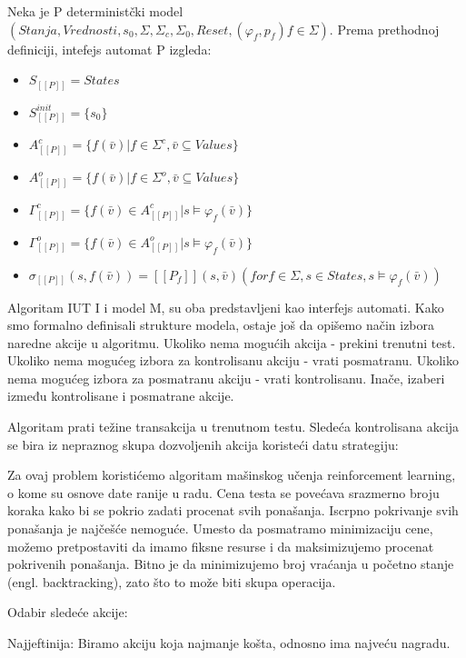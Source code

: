 \documentclass[a4paper]{article}
\begin{document}
Neka je P deterministčki model $(Stanja, Vrednosti, s_0, \Sigma, \Sigma_c, \Sigma_0, Reset, (\varphi_f, p_f)f \in \Sigma)$. Prema prethodnoj definiciji, intefejs automat P izgleda:


\begin{itemize}
\item $S_{[[P]]} = States$
\item $S^{init}_{[[P]]} = \{s_0\}$
\item $A^c_{[[P]]} = \{ f(\bar{v}) | f \in \Sigma^c, \bar{v} \subseteq Values \}$ 
\item $A^o_{[[P]]} = \{ f(\bar{v}) | f \in \Sigma^o, \bar{v} \subseteq Values \}$
\item $\Gamma^c_{[[P]]} = \{ f(\bar{v}) \in A^c_{[[P]]} | s \models \varphi_f(\bar{v}) \}$ 
\item $\Gamma^o_{[[P]]} = \{ f(\bar{v}) \in A^o_{[[P]]} | s \models \varphi_f(\bar{v}) \}$
\item $\sigma_{[[P]]}(s, f(\bar{v})) = [[P_f]](s, \bar{v}) (for f \in \Sigma, s \in States, s \models \varphi_f(\bar{v}))$
\end{itemize}

Algoritam
IUT I i model M, su oba predstavljeni kao interfejs automati.
Kako smo formalno definisali strukture modela, ostaje još da opišemo način izbora naredne akcije u algoritmu.
Ukoliko nema mogućih akcija - prekini trenutni test. 
Ukoliko nema mogućeg izbora za kontrolisanu akciju - vrati posmatranu.
Ukoliko nema mogućeg izbora za posmatranu akciju - vrati kontrolisanu.
Inače, izaberi između kontrolisane i posmatrane akcije.

Algoritam prati težine transakcija u trenutnom testu. Sledeća kontrolisana akcija se bira iz nepraznog skupa dozvoljenih akcija koristeći datu strategiju:

Za ovaj problem koristićemo algoritam mašinskog učenja reinforcement learning, o kome su osnove date ranije u radu. %
Cena testa se povećava srazmerno broju koraka kako bi se pokrio zadati procenat svih ponašanja. Iscrpno pokrivanje svih ponašanja je najčešće nemoguće. Umesto da posmatramo minimizaciju cene, možemo pretpostaviti da imamo fiksne resurse i da maksimizujemo procenat pokrivenih ponašanja. Bitno je da minimizujemo broj vraćanja u početno stanje (engl. backtracking), zato što to može biti skupa operacija. %

Odabir sledeće akcije:

Najjeftinija: 
Biramo akciju koja najmanje košta, odnosno ima najveću nagradu.
\end{document}
